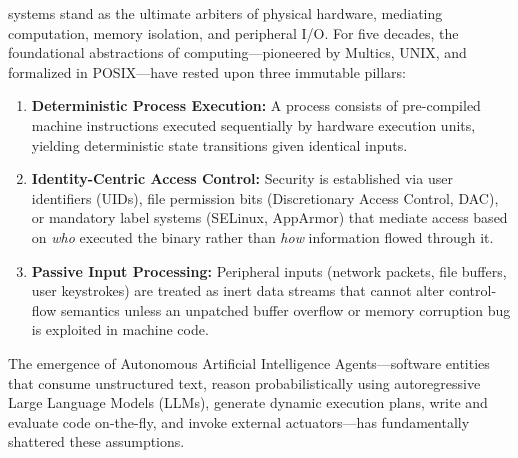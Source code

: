 \documentclass[10pt,journal,compsoc]{IEEEtran}
\theoremstyle{definition}
\begin{document}
 systems stand as the ultimate arbiters of physical hardware, mediating computation, memory isolation, and peripheral I/O. For five decades, the foundational abstractions of computing—pioneered by Multics, UNIX, and formalized in POSIX—have rested upon three immutable pillars:
\begin{enumerate}
    \item \textbf{Deterministic Process Execution:} A process consists of pre-compiled machine instructions executed sequentially by hardware execution units, yielding deterministic state transitions given identical inputs.
    \item \textbf{Identity-Centric Access Control:} Security is established via user identifiers (UIDs), file permission bits (Discretionary Access Control, DAC), or mandatory label systems (SELinux, AppArmor) that mediate access based on \textit{who} executed the binary rather than \textit{how} information flowed through it.
    \item \textbf{Passive Input Processing:} Peripheral inputs (network packets, file buffers, user keystrokes) are treated as inert data streams that cannot alter control-flow semantics unless an unpatched buffer overflow or memory corruption bug is exploited in machine code.
\end{enumerate}

The emergence of Autonomous Artificial Intelligence Agents—software entities that consume unstructured text, reason probabilistically using autoregressive Large Language Models (LLMs), generate dynamic execution plans, write and evaluate code on-the-fly, and invoke external actuators—has fundamentally shattered these assumptions. 
\end{document}
